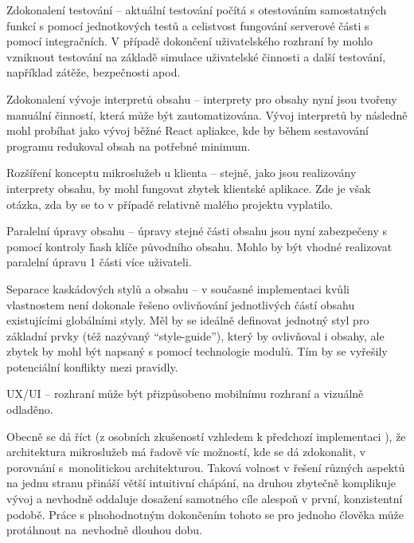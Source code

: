 \begin{dl}
   \item[Zdokonalení testování] – aktuální testování počítá s otestováním samostatných funkcí s pomocí jednotkových testů a celistvost fungování serverové části s pomocí integračních.
   V případě dokončení uživatelského rozhraní by mohlo vzniknout testování na základě simulace uživatelské činnosti a další testování, například zátěže, bezpečnosti apod.
   \item[Zdokonalení vývoje interpretů obsahu] – interprety pro obsahy nyní jsou tvořeny manuální činností, která může být zautomatizována.
   Vývoj interpretů by následně mohl probíhat jako vývoj běžné React apliakce, kde by během sestavování programu redukoval obsah na potřebné minimum.
   \item[Rozšíření konceptu mikroslužeb u klienta] – stejně, jako jsou realizovány interprety obsahu, by mohl fungovat zbytek klientské aplikace.
   Zde je však otázka, zda by se to v případě relativně malého projektu vyplatilo.
   \item[Paralelní úpravy obsahu] – úpravy stejné části obsahu jsou nyní zabezpečeny s pomocí kontroly \h{hash} klíče původního obsahu.
   Mohlo by být vhodné realizovat paralelní úpravu 1 části více uživateli.
   \item[Separace kaskádových stylů a obsahu] – v současné implementaci kvůli vlastnostem  není dokonale řešeno ovlivňování jednotlivých částí obsahu existujícími globálními styly.
   Měl by se ideálně definovat jednotný styl pro základní prvky (též nazývaný \enquote{style-guide}), který by ovlivňoval i obsahy, ale zbytek by mohl být napsaný s pomocí technologie  modulů.
   Tím by se vyřešily potenciální konflikty mezi  pravidly.
   \item[UX/UI] – rozhraní může být přizpůsobeno mobilnímu rozhraní a vizuálně odladěno.
\end{dl}

Obecně se dá říct (z osobních zkušeností vzhledem k předchozí implementaci ), že architektura mikroslužeb má řadově víc možností, kde se dá zdokonalit, v porovnání s~monolitickou architekturou.
Taková volnost v řešení různých aspektů na jednu stranu přináší větší intuitivní chápání, na druhou zbytečně komplikuje vývoj a nevhodně oddaluje dosažení samotného cíle alespoň v první, konzistentní podobě.
Práce s plnohodnotným dokončením tohoto  se pro jednoho člověka může protáhnout na~nevhodně dlouhou dobu.
